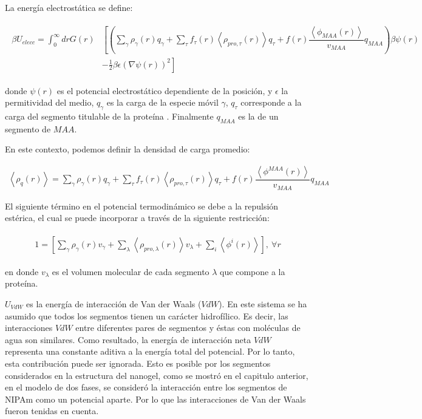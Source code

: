 La energ\'ia electrost\'atica se define:

\begin{align}
	\begin{aligned}
		\beta U_{elecc}= \int_0^\infty drG(r)&\left[\left(\sum_{\gamma } {\rho_\gamma(r) q_\gamma + \sum_\tau{f_\tau(r) \left<\rho_{pro,\tau}(r)\right> q_\tau} +  f(r)\dfrac{\left<\phi_{MAA}(r)\right>}{v_{MAA}}q_{MAA}}\right)\beta\psi(r) \right. \\ &\left.-\frac{1}{2}\beta\epsilon(\nabla\psi(r))^2 \right]
	\end{aligned}
\end{align} 

\noindent donde $\psi(r)$ es el potencial electrost\'atico dependiente de la posici\'on, y $\epsilon$ la permitividad del medio, $q_\gamma$ es la carga de la especie m\'ovil $\gamma$, $q_\tau$ corresponde a la carga del segmento titulable de la prote\'ina . Finalmente $q_{MAA}$ es la de un segmento de $MAA$.

En este contexto, podemos definir la densidad de carga promedio: 

\begin{align}
	\left<\rho_q(r)\right> = \sum_{\gamma } {\rho_\gamma(r) q_\gamma + \sum_\tau{f_\tau(r) \left<\rho_{pro,\tau}(r)\right> q_\tau} +  f(r)\dfrac{\left<\phi^{MAA}(r)\right>}{v_{MAA}}q_{MAA}}
	\label{eq:esf:rho-charge}
\end{align}  
             
El siguiente t\'ermino en el potencial termodin\'amico se debe a la repulsi\'on est\'erica, el cual se puede incorporar a trav\'es de la siguiente restricci\'on:

\begin{align}
	\begin{aligned}
		1=  {\left[\sum_{\gamma}\rho_\gamma(r) v_\gamma + \sum_\lambda{\left<\rho_{pro,\lambda}(r)\right>v_\lambda} + \sum_i{\left<\phi^i(r)\right>}\right]},~ \forall r
	\end{aligned}
	\label{eq:esf:constraint}
\end{align}


\noindent en donde $v_\lambda$  es el volumen molecular de cada segmento $\lambda$  que compone a la prote\'ina.



$U_{VdW}$ es la energ\'ia de interacci\'on de Van der Waals ($VdW$). En este sistema se ha asumido que todos los segmentos tienen un car\'acter hidrof\'ilico. Es decir, las interacciones $VdW$ entre diferentes pares de segmentos y \'estas con mol\'eculas de agua son similares. Como resultado, la energ\'ia de interacci\'on neta $VdW$ representa una constante aditiva a la energ\'ia total del potencial.
Por lo tanto, esta contribuci\'on puede ser ignorada. 
Esto es posible por los segmentos considerados en la estructura del nanogel, como se mostr\'o en el capitulo anterior, en el modelo de dos fases, se consider\'o la interacci\'on entre los segmentos de NIPAm como un potencial aparte. Por lo que las interacciones de Van der Waals fueron tenidas en cuenta.



